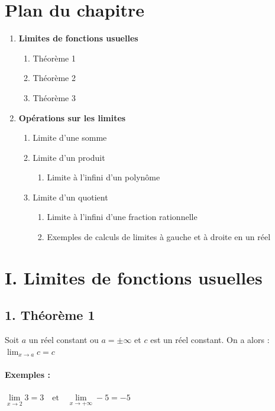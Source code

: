 \documentclass[12pt,a4paper]{article}
\begin{document}
\section*{Plan du chapitre}
\begin{enumerate}[label=\Roman*.]
    \item \textbf{Limites de fonctions usuelles}
    \begin{enumerate}
        \item Théorème 1
        \item Théorème 2
        \item Théorème 3
    \end{enumerate}
    \item \textbf{Opérations sur les limites}
    \begin{enumerate}
        \item Limite d'une somme
        \item Limite d'un produit
        \begin{enumerate}
            \item Limite à l'infini d'un polynôme
        \end{enumerate}
        \item Limite d'un quotient
        \begin{enumerate}
            \item Limite à l'infini d'une fraction rationnelle
            \item Exemples de calculs de limites à gauche et à droite en un réel
        \end{enumerate}
    \end{enumerate}
\end{enumerate}

\newpage
\section*{\color{myred} I. Limites de fonctions usuelles }
\subsection*{\color{myred} 1. Théorème 1 }

Soit \( a \) un réel constant ou \( a = \pm \infty \) et \( c \) est un réel constant. On a alors :
$
\lim_{x \to a} c = c
$

\paragraph{Exemples :}
$
\lim\limits_{x \to 2} 3 = 3 \quad \text{et} \quad \lim\limits_{x \to +\infty} -5 = -5
$
\end{document}

